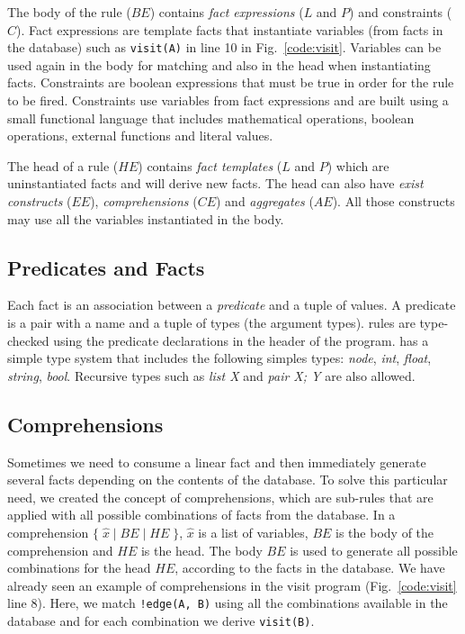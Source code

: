 The body of the rule ($BE$) contains \emph{fact expressions} ($L$ and $P$) and
constraints ($C$). Fact expressions are template facts that instantiate variables
(from facts in the database)
such as \texttt{visit(A)} in line 10 in Fig.~\ref{code:visit}. Variables can be used again in the body for matching and
also in the head when instantiating facts. Constraints are boolean expressions that must
be true in order for the rule to be fired. Constraints use variables from fact expressions and are built using a small functional language that includes mathematical operations, boolean operations, external functions and literal values.

The head of a rule ($HE$) contains \emph{fact templates} ($L$ and $P$) which are uninstantiated facts and will derive new facts. The head can also have \emph{exist constructs} ($EE$), \emph{comprehensions} ($CE$) and \emph{aggregates} ($AE$). All those constructs
may use all the variables instantiated in the body.

\subsection{Predicates and Facts}

Each fact is an association between a \emph{predicate} and a tuple of values. A predicate is a pair with a name and a tuple of types (the argument types). \lang rules are type-checked using the predicate declarations in the header of the program. \lang has a simple type system that includes the following simples types: \emph{node}, \emph{int}, \emph{float}, \emph{string}, \emph{bool}. Recursive types such as \emph{list X} and \emph{pair X; Y} are
also allowed.

\subsection{Comprehensions}

Sometimes we need to consume a linear fact and then immediately generate several facts depending on
the contents of the database. To solve this particular need, we created the concept of comprehensions, which are
sub-rules that are applied with all possible combinations of facts from the database. In a comprehension $\{ \; \widehat{x} \; | \; BE \; | \; HE \; \}$,
$\widehat{x}$ is a list of variables, $BE$ is the body of the comprehension and $HE$ is the head.
The body $BE$ is used to generate all possible combinations for the head $HE$, according to the facts
in the database.
We have already seen an example of comprehensions in the visit program (Fig.~\ref{code:visit} line 8).
Here, we match \texttt{!edge(A, B)} using all the combinations
available in the database and for each combination we derive \texttt{visit(B)}.

